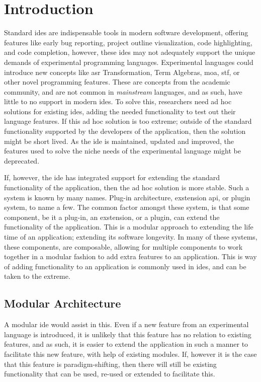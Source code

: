 \chapter{Introduction}

Standard \gls{ide}s are indispensable tools in modern software development,
offering features like early bug reporting, project outline visualization, code
highlighting, and code completion, however, these \gls{ide}s may not adequately
support the unique demands of experimental programming languages. Experimental
languages could introduce new concepts like \gls{asr} Transformation, Term
Algebras, \gls{moa}, \gls{stf}, or other novel programming features. These are
concepts from the academic community, and are not common in \textit{mainstream}
languages, and as such, have little to no support in modern \gls{ide}s. To solve
this, researchers need ad hoc solutions for existing \gls{ide}s, adding the
needed functionality to test out their language features. If this ad hoc
solution is too extreme; outside of the standard functionality supported by the
developers of the application, then the solution might be short lived. As the
\gls{ide} is maintained, updated and improved, the features used to solve the
niche needs of the experimental language might be deprecated.

If, however, the \gls{ide} has integrated support for extending the standard
functionality of the application, then the ad hoc solution is more stable. Such
a system is known by many names. Plug-in architecture, exstension \gls{api}, or
plugin system, to name a few. The common factor amongst these system, is that
some component, be it a plug-in, an exstension, or a plugin, can extend the
functionality of the application. This is a modular approach to extending the
life time of an application; extending its software longevity. In many of these
systems, these components, are composable, allowing for multiple components to
work together in a modular fashion to add extra features to an application. This
is way of adding functionality to an application is commonly used in \gls{ide}s,
and can be taken to the extreme.


\section{Modular Architecture}

A modular \gls{ide} would assist in this. Even if a new feature from an
experimental language is introduced, it is unlikely that this feature has no
relation to existing features, and as such, it is easier to extend the
application in such a manner to facilitate this new feature, with help of
existing modules. If, however it is the case that this feature is
paradigm-shifting, then there will still be existing functionality that can be
used, re-used or extended to facilitate this.

